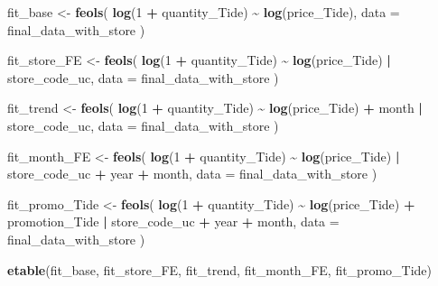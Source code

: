 \documentclass[
]{article}
\newenvironment{Shaded}{\begin{snugshade}}{\end{snugshade}}
\newcommand{\AttributeTok}[1]{\textcolor[rgb]{0.13,0.29,0.53}{#1}}
\newcommand{\DecValTok}[1]{\textcolor[rgb]{0.00,0.00,0.81}{#1}}
\newcommand{\FunctionTok}[1]{\textcolor[rgb]{0.13,0.29,0.53}{\textbf{#1}}}
\newcommand{\NormalTok}[1]{#1}
\newcommand{\OtherTok}[1]{\textcolor[rgb]{0.56,0.35,0.01}{#1}}
\newcommand{\SpecialCharTok}[1]{\textcolor[rgb]{0.81,0.36,0.00}{\textbf{#1}}}
\begin{document}
\begin{Shaded}
\begin{Highlighting}[]
\NormalTok{fit\_base }\OtherTok{\textless{}{-}} \FunctionTok{feols}\NormalTok{(}
  \FunctionTok{log}\NormalTok{(}\DecValTok{1} \SpecialCharTok{+}\NormalTok{ quantity\_Tide) }\SpecialCharTok{\textasciitilde{}} \FunctionTok{log}\NormalTok{(price\_Tide),}
  \AttributeTok{data =}\NormalTok{ final\_data\_with\_store}
\NormalTok{)}

\NormalTok{fit\_store\_FE }\OtherTok{\textless{}{-}} \FunctionTok{feols}\NormalTok{(}
  \FunctionTok{log}\NormalTok{(}\DecValTok{1} \SpecialCharTok{+}\NormalTok{ quantity\_Tide) }\SpecialCharTok{\textasciitilde{}} \FunctionTok{log}\NormalTok{(price\_Tide) }\SpecialCharTok{|}\NormalTok{ store\_code\_uc,}
  \AttributeTok{data =}\NormalTok{ final\_data\_with\_store}
\NormalTok{)}

\NormalTok{fit\_trend }\OtherTok{\textless{}{-}} \FunctionTok{feols}\NormalTok{(}
  \FunctionTok{log}\NormalTok{(}\DecValTok{1} \SpecialCharTok{+}\NormalTok{ quantity\_Tide) }\SpecialCharTok{\textasciitilde{}} \FunctionTok{log}\NormalTok{(price\_Tide) }\SpecialCharTok{+}\NormalTok{ month }\SpecialCharTok{|}\NormalTok{ store\_code\_uc,}
  \AttributeTok{data =}\NormalTok{ final\_data\_with\_store}
\NormalTok{)}

\NormalTok{fit\_month\_FE }\OtherTok{\textless{}{-}} \FunctionTok{feols}\NormalTok{(}
  \FunctionTok{log}\NormalTok{(}\DecValTok{1} \SpecialCharTok{+}\NormalTok{ quantity\_Tide) }\SpecialCharTok{\textasciitilde{}} \FunctionTok{log}\NormalTok{(price\_Tide) }\SpecialCharTok{|}\NormalTok{ store\_code\_uc }\SpecialCharTok{+}\NormalTok{ year }\SpecialCharTok{+}\NormalTok{ month,}
  \AttributeTok{data =}\NormalTok{ final\_data\_with\_store}
\NormalTok{)}

\NormalTok{fit\_promo\_Tide }\OtherTok{\textless{}{-}} \FunctionTok{feols}\NormalTok{(}
  \FunctionTok{log}\NormalTok{(}\DecValTok{1} \SpecialCharTok{+}\NormalTok{ quantity\_Tide) }\SpecialCharTok{\textasciitilde{}} \FunctionTok{log}\NormalTok{(price\_Tide) }\SpecialCharTok{+} 
\NormalTok{    promotion\_Tide }\SpecialCharTok{|}\NormalTok{ store\_code\_uc }\SpecialCharTok{+}\NormalTok{ year }\SpecialCharTok{+}\NormalTok{ month,}
  \AttributeTok{data =}\NormalTok{ final\_data\_with\_store}
\NormalTok{)}

\FunctionTok{etable}\NormalTok{(fit\_base, fit\_store\_FE, fit\_trend, fit\_month\_FE, fit\_promo\_Tide)}
\end{Highlighting}
\end{Shaded}
\end{document}
